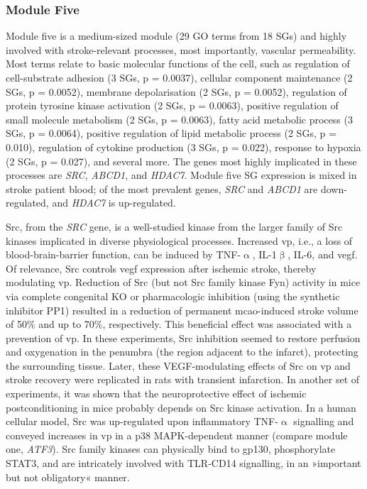 \subsubsection{Module Five}
Module five is a medium-sized module (29 GO terms from 18 SGs) and highly involved with stroke-relevant processes, most importantly, vascular permeability. Most terms relate to basic molecular functions of the cell, such as regulation of cell-substrate adhesion (3 SGs, p = 0.0037), cellular component maintenance (2 SGs, p = 0.0052), membrane depolarisation (2 SGs, p = 0.0052), regulation of protein tyrosine kinase activation (2 SGs, p = 0.0063), positive regulation of small molecule metabolism (2 SGs, p = 0.0063), fatty acid metabolic process (3 SGs, p = 0.0064), positive regulation of lipid metabolic process (2 SGs, p = 0.010), regulation of cytokine production (3 SGs, p = 0.022), response to hypoxia (2 SGs, p = 0.027), and several more. The genes most highly implicated in these processes are \emph{SRC}, \emph{ABCD1}, and \emph{HDAC7}. Module five SG expression is mixed in stroke patient blood; of the most prevalent genes, \emph{SRC} and \emph{ABCD1} are down-regulated, and \emph{HDAC7} is up-regulated.

Src, from the \emph{SRC} gene, is a well-studied kinase from the larger family of Src kinases implicated in diverse physiological processes. Increased \acf{vp}, i.e., a loss of blood-brain-barrier function, can be induced by TNF-$\upalpha$, IL-1$\upbeta$, IL-6, and \ac{vegf}. Of relevance, Src controls \ac{vegf} expression after ischemic stroke, thereby modulating \ac{vp}. Reduction of Src (but not Src family kinase Fyn) activity in mice via complete congenital KO or pharmacologic inhibition (using the synthetic inhibitor PP1) resulted in a reduction of permanent \ac{mcao}-induced stroke volume of 50\% and up to 70\%, respectively. This beneficial effect was associated with a prevention of \ac{vp}.\cite{Paul2001} In these experiments, Src inhibition seemed to restore perfusion and oxygenation in the penumbra (the region adjacent to the infarct), protecting the surrounding tissue. Later, these VEGF-modulating effects of Src on \ac{vp} and stroke recovery were replicated in rats with transient infarction.\cite{Zan2014} In another set of experiments, it was shown that the neuroprotective effect of ischemic postconditioning in mice probably depends on Src kinase activation.\cite{Kumar2014b} In a human cellular model, Src was up-regulated upon inflammatory TNF-$\upalpha$ signalling and conveyed increases in \ac{vp} in a p38 MAPK-dependent manner (compare module one, \emph{ATF3}).\cite{Adam2016} Src family kinases can physically bind to gp130, phosphorylate STAT3,\cite{Brown1996} and are intricately involved with TLR-CD14 signalling, in an »important but not obligatory« manner.\cite{Okutani2006} 

